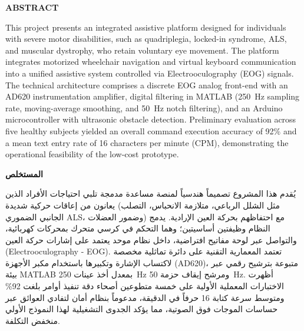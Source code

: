 \thispagestyle{plain}
\vspace*{0.2cm}

\begin{center}
{\fontsize{15}{18}\selectfont\bfseries ABSTRACT}
\end{center}
\vspace{0.2cm}

\fontsize{11}{16.5}\selectfont
{}
This project presents an integrated assistive platform designed for individuals with severe motor disabilities, such as quadriplegia, locked-in syndrome, ALS, and muscular dystrophy, who retain voluntary eye movement. The platform integrates motorized wheelchair navigation and virtual keyboard communication into a unified assistive system controlled via Electrooculography (EOG) signals. The technical architecture comprises a discrete EOG analog front-end with an AD620 instrumentation amplifier, digital filtering in MATLAB (250~Hz sampling rate, moving-average smoothing, and 50~Hz notch filtering), and an Arduino microcontroller with ultrasonic obstacle detection. Preliminary evaluation across five healthy subjects yielded an overall command execution accuracy of 92\% and a mean text entry rate of 16 characters per minute (CPM), demonstrating the operational feasibility of the low-cost prototype.

\vspace{0.8cm}

\begin{center}
\begin{Arabic}
{\fontsize{15}{18}\selectfont\bfseries المستخلص}
\end{Arabic}
\end{center}
\vspace{0.2cm}

\begin{Arabic}
\fontsize{11.5}{18}\selectfont
{}
يُقدم هذا المشروع تصميماً هندسياً لمنصة مساعدة مدمجة تلبي احتياجات الأفراد الذين يعانون من إعاقات حركية شديدة (مثل الشلل الرباعي، متلازمة الانحباس، التصلب الجانبي الضموري ALS، وضمور العضلات) مع احتفاظهم بحركة العين الإرادية. يدمج النظام وظيفتين أساسيتين؛ وهما التحكم في كرسي متحرك بمحركات كهربائية، والتواصل عبر لوحة مفاتيح افتراضية، داخل نظام موحد يعتمد على إشارات حركة العين (Electrooculography - EOG). تعتمد المعمارية التقنية على دائرة تماثلية مخصصة لاكتساب الإشارة وتكبيرها باستخدام مكبر الأجهزة (AD620)، متبوعة بترشيح رقمي عبر بيئة MATLAB بمعدل أخذ عينات 250~Hz ومرشح إيقاف حزمة 50~Hz. أظهرت الاختبارات المعملية الأولية على خمسة متطوعين أصحاء دقة تنفيذ أوامر بلغت 92\% ومتوسط سرعة كتابة 16 حرفاً في الدقيقة، مدعوماً بنظام أمان لتفادي العوائق عبر حساسات الموجات فوق الصوتية، مما يؤكد الجدوى التشغيلية لهذا النموذج الأولي منخفض التكلفة.
\end{Arabic}

\normalsize
\clearpage
